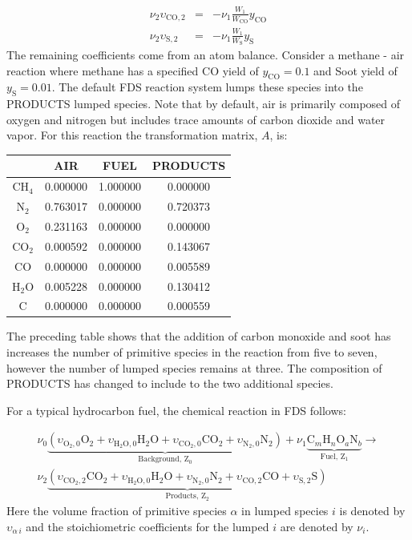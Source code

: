 \begin{eqnarray}\label{eq:yields}
\nu_{2}\upsilon_{\mathrm{CO},2}&=&-\nu_{1}\frac{W_1}{W_{\mathrm{CO}}}y_{\mathrm{CO}} \\
\nu_{2}\upsilon_{\mathrm{S},2}&=&-\nu_{1}\frac{W_1}{W_{\mathrm{S}}}y_{\mathrm{S}}
\end{eqnarray}
The remaining coefficients come from an atom balance. Consider a methane - air reaction where methane has a specified CO yield of $y_{\mathrm{CO}}=0.1$ and Soot yield of $y_{\mathrm{S}}=0.01$. The default FDS reaction system lumps these species into the {\ct PRODUCTS} lumped species. Note that by default, air is primarily composed of oxygen and nitrogen but includes trace amounts of carbon dioxide and water vapor. For this reaction the transformation matrix, $A$, is:

\begin{center}
\begin{tabular}{|c|c|c|c|}
\hline  & {\ct AIR} & {\ct FUEL} & {\ct PRODUCTS} \\ \hline \hline
{CH$_4$}           & 0.000000 & 1.000000 & 0.000000 \\
{N$_2$}            & 0.763017 & 0.000000 & 0.720373 \\
{O$_2$}            & 0.231163 & 0.000000 & 0.000000 \\
{CO$_2$}           & 0.000592 & 0.000000 & 0.143067 \\
{CO}               & 0.000000 & 0.000000 & 0.005589 \\ 
{H$_2$O}           & 0.005228 & 0.000000 & 0.130412 \\
{C}                & 0.000000 & 0.000000 & 0.000559 \\ \hline
\end{tabular}
\end{center}

The preceding table shows that the addition of carbon monoxide and soot has increases the number of primitive species in the reaction from five to seven, however the number of lumped species remains at three. The composition of {\ct PRODUCTS} has changed to include to the two additional species.

For a typical hydrocarbon fuel, the chemical reaction in FDS follows:

\begin{eqnarray}\label{eq:full_lump}
\nu_{0}\underbrace{(\upsilon_{\mathrm{O}_{2},0}\mathrm{O}_2+\upsilon_{\mathrm{H}_{2}\mathrm{O},0}\mathrm{H}_2\mathrm{O}+\upsilon_{\mathrm{CO}_{2},0}\mathrm{CO}_2+\upsilon_{\mathrm{N}_{2},0}\mathrm{N}_2)}_\text{Background,~Z$_0$}+\nu_{1}\underbrace{\mbox{C}_m\mbox{H}_n\mbox{O}_a\mbox{N}_b}_\text{Fuel,~Z$_1$} \rightarrow \\
\nonumber \nu_{2}\underbrace{(\upsilon_{\mathrm{CO}_{2},2}\mathrm{CO}_2+\upsilon_{\mathrm{H}_{2}\mathrm{O},0}\mathrm{H}_2\mathrm{O}+\upsilon_{\mathrm{N}_{2},0}\mathrm{N}_2+\upsilon_{\mathrm{CO},2}\mathrm{CO}+\upsilon_{\mathrm{S},2}\mathrm{S})}_\text{Products,~Z$_2$}
\end{eqnarray}
Here the volume fraction of primitive species $\alpha$ in lumped species $i$ is denoted by $\upsilon_{\alpha\,i}$ and the stoichiometric coefficients for the lumped $i$ are denoted by $\nu_{i}$.


